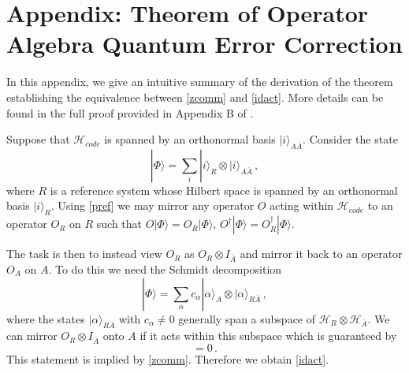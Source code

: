 \documentclass[aps,prl,twocolumn,nofootinbib,longbibliography,superscriptaddress]{revtex4-1}
\newcommand{\be}{\begin{equation}}
\newcommand{\ee}{\end{equation}}
\newcommand{\Ab}{\overline{A}}
\newcommand{\HAb}{\mathcal{H}_{\overline{A}}}
\newcommand{\Hc}{\mathcal{H}_{code}}
\def\a{\alpha}
\def\P{\Phi}
\def\r{\rho}
\def\la{\label}
\def\er{\eqref}
\def\>{\rangle}
\begin{document}
\section{Appendix: Theorem of Operator Algebra Quantum Error Correction}

In this appendix, we give an intuitive summary of the derivation of the theorem establishing the equivalence between \er{zcomm} and \er{idact}.  More details can be found in the full proof provided in Appendix B of \cite{Almheiri:2014lwa}.

Suppose that $\Hc$ is spanned by an orthonormal basis $|i\>_{A\Ab}$.  Consider the state
\be\la{pref}
|\P\> = \sum_i |i\>_R \otimes |i\>_{A\Ab} \,,
\ee
where $R$ is a reference system whose Hilbert space is spanned by an orthonormal basis $|i\>_R$.  Using \er{pref} we may mirror any operator $O$ acting within $\Hc$ to an operator $O_R$ on $R$ such that $O|\P\> = O_R|\P\>$, $O^\dag |\P\> = O_R^\dag |\P\>$.

The task is then to instead view $O_R$ as $O_R \otimes I_{\Ab}$ and mirror it back to an operator $O_A$ on $A$.  To do this we need the Schmidt decomposition
\be
|\P\> = \sum_\a c_\a |\a\>_A \otimes |\a\>_{R\Ab} \,,
\ee
where the states $|\a\>_{R\Ab}$ with $c_\a \neq 0$ generally span a subspace of $\mathcal{H}_R \otimes \HAb$.  We can mirror $O_R \otimes I_{\Ab}$ onto $A$ if it acts within this subspace which is guaranteed by
\be
[O_R \otimes I_{\Ab}, \r_{R\Ab}(\P)] = 0 \,.
\ee
This statement is implied by \er{zcomm}.  Therefore we obtain \er{idact}.


\end{document}
